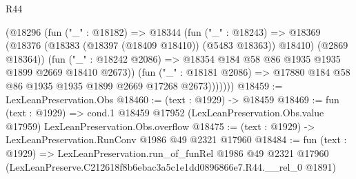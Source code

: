\begin{lexlean}{R44}
\begin{coremodule}
              (@18296
                (fun ("_" : @18182) =>
                @18344
                  (fun ("_" : @18243) =>
                  @18369
                    (@18376 (@18383 (@18397 (@18409 @18410)) (@5483 @18363)) @18410)
                    (@2869 @18364))
                  (fun ("_" : @18242 @2086) =>
                  @18354 @184 @58 @86 @1935 @1935 @1899 @2669 @18410 @2673))
                (fun ("_" : @18181 @2086) =>
                @17880 @184 @58 @86 @1935 @1935 @1899 @2669 @17268 @2673)))))))
@18459 := LexLeanPreservation.Obs
@18460 := (text : @1929) -> @18459
@18469 := fun (text : @1929) =>
  cond.{1} @18459 @17952 (LexLeanPreservation.Obs.value @17959) LexLeanPreservation.Obs.overflow
@18475 := (text : @1929) -> LexLeanPreservation.RunConv @1986 @49 @2321 @17960
@18484 := fun (text : @1929) =>
  LexLeanPreservation.run_of_funRel
    @1986
    @49
    @2321
    @17960
    (LexLeanPreserve.C212618f8b6ebac3a5c1e1dd0896866e7.R44.__rel_0 @1891)
\end{coremodule}
\end{lexlean}
